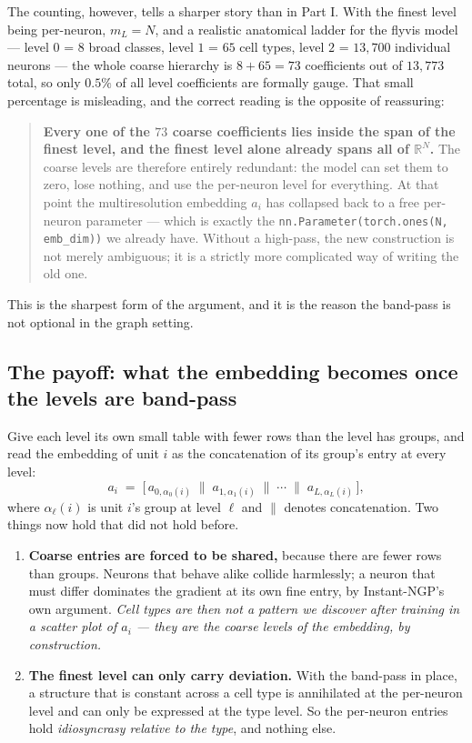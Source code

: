 \documentclass[11pt,a4paper]{article}
\begin{document}
The counting, however, tells a sharper story than in Part I. With the finest level being
per-neuron, $m_L = N$, and a realistic anatomical ladder for the flyvis model --- level $0$
= $8$ broad classes, level $1$ = $65$ cell types, level $2$ = $13{,}700$ individual
neurons --- the whole coarse hierarchy is $8 + 65 = 73$ coefficients out of $13{,}773$
total, so only $0.5\%$ of all level coefficients are formally gauge. That small percentage
is misleading, and the correct reading is the opposite of reassuring:

\begin{quote}
\textbf{Every one of the $73$ coarse coefficients lies inside the span of the finest
level, and the finest level alone already spans all of $\mathbb{R}^{N}$.} The coarse levels
are therefore entirely redundant: the model can set them to zero, lose nothing, and use the
per-neuron level for everything. At that point the multiresolution embedding $a_i$ has
collapsed back to a free per-neuron parameter --- which is exactly the
\texttt{nn.Parameter(torch.ones(N, emb\_dim))} we already have. Without a high-pass, the
new construction is not merely ambiguous; it is a strictly more complicated way of writing
the old one.
\end{quote}

\noindent
This is the sharpest form of the argument, and it is the reason the band-pass is not
optional in the graph setting.

\subsection{The payoff: what the embedding becomes once the levels are band-pass}

Give each level its own small table with fewer rows than the level has groups, and read the
embedding of unit $i$ as the concatenation of its group's entry at every level:
\begin{equation}
a_i \;=\; \Big[\, a_{0,\alpha_0(i)} \;\big\|\; a_{1,\alpha_1(i)} \;\big\|\; \cdots
\;\big\|\; a_{L,\alpha_L(i)} \,\Big] ,
\label{eq:gembedding}
\end{equation}
where $\alpha_\ell(i)$ is unit $i$'s group at level $\ell$ and $\|$ denotes concatenation.
Two things now hold that did not hold before.

\begin{enumerate}[leftmargin=1.4em,itemsep=3pt]
\item \textbf{Coarse entries are forced to be shared,} because there are fewer rows than
groups. Neurons that behave alike collide harmlessly; a neuron that must differ dominates
the gradient at its own fine entry, by Instant-NGP's own argument. \emph{Cell types are
then not a pattern we discover after training in a scatter plot of $a_i$ --- they are the
coarse levels of the embedding, by construction.}

\item \textbf{The finest level can only carry deviation.} With the band-pass in place, a
structure that is constant across a cell type is annihilated at the per-neuron level and
can only be expressed at the type level. So the per-neuron entries hold \emph{idiosyncrasy
relative to the type}, and nothing else.
\end{enumerate}
\end{document}
